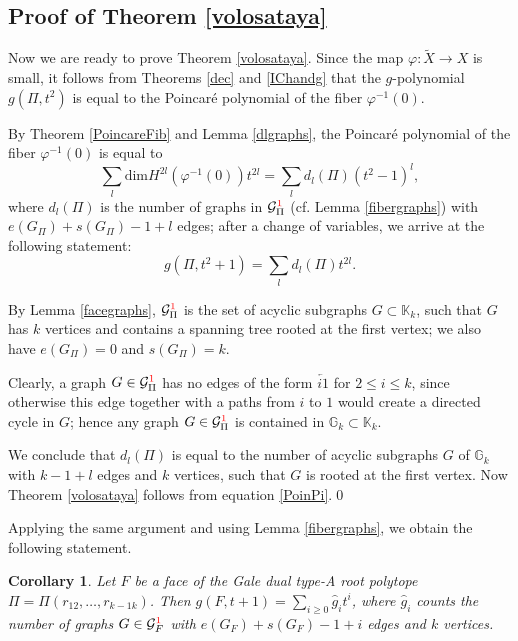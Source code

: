 \documentclass[11pt]{article}
\newtheorem{coro}[theo]{Corollary}
\theoremstyle{definition}
\numberwithin{equation}{section}
\begin{document}
\subsection{Proof of Theorem \ref{volosataya}}\label{S4.4}

Now we are ready to prove Theorem \ref{volosataya}. Since the map $\varphi: 
\widetilde{X}\to X$ is small, it follows from Theorems \ref{dec}  and 
\ref{IChandg}  that the $g$-polynomial $g(\Pi, t^2)$ is equal to the Poincar\'e 
polynomial of the fiber $\varphi^{-1}(0)$. 

By Theorem \ref{PoincareFib} and Lemma \ref{dlgraphs}, the Poincar\'e 
polynomial of the fiber $\varphi^{-1}(0)$ is equal to 
\begin{equation*} 
\sum_{l} \mathrm{dim}H^{2l}(\varphi^{-1}(0))t^{2l} = \sum_{l} d_l(\Pi)(t^2-1)^{l},
\end{equation*}
where $d_l(\Pi)$ is the number of graphs in 
$\mathcal{G}^{\textcolor{red}{1}}_\Pi$ (cf.  Lemma \ref{fibergraphs}) with 
$e(G_\Pi)+s(G_\Pi)-1+l$ edges; after a change of variables, we arrive at the 
following statement:
\begin{equation}\label{PoinPi}
 g(\Pi, t^2+1) = \sum_{l} d_l(\Pi)t^{2l}.
 \end{equation}

By Lemma \ref{facegraphs}, $\mathcal{G}^{\textcolor{red}{1}}_\Pi$ is the set of acyclic subgraphs $G\subset\mathbb{K}_k$, such that $G$ has $k$ vertices and contains a spanning tree rooted at the first vertex; we also have $e(G_\Pi)=0$ and $s(G_\Pi)=k$.   

Clearly, a graph $G\in \mathcal{G}^{\textcolor{red}{1}}_\Pi$ has no edges of the form $\overleftarrow{i1}$ for $2\leq i \leq k$, since otherwise this edge together with a paths from $i$ to $1$ would create a directed cycle in $G$; hence any graph $G\in \mathcal{G}^{\textcolor{red}{1}}_\Pi$ is contained in $\mathbb{G}_k\subset\mathbb{K}_k$. 


We conclude that $d_l(\Pi)$ is equal to the number of acyclic  subgraphs $G$ of 
$\mathbb{G}_k$ with $k-1+l$ edges and $k$ vertices, such that $G$ is rooted at 
the first vertex. Now Theorem \ref{volosataya} follows from equation 
\eqref{PoinPi}.\qed


Applying the same argument and using Lemma \ref{fibergraphs},  we obtain the following statement. 
\begin{coro}\label{g-polyF} Let $F$ be a face of the Gale dual type-A 
root polytope $\Pi = \Pi(r_{12}, \ldots ,r_{k-1 k})$. Then 
$g(F, t+1) = \sum_{i\geq 0} \hat{g}_it^i$,
where $\hat{g}_i$ counts the number of graphs $G\in \mathcal{G}^{\textcolor{red}{1}}_F$ with $e(G_F)+s(G_F)-1+i$ edges and $k$ vertices.
\end{coro}
\end{document}
